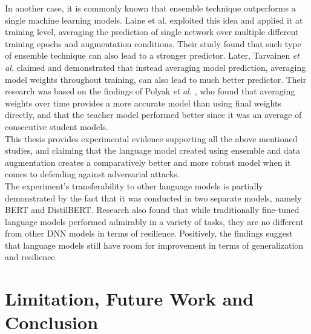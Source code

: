 \documentclass[%
	BCOR=8mm, %
	DIV=12,
	toc=bibliography, %
	toc=listof, %
	oneside, %
	egregdoesnotlikesansseriftitles, %
	]{scrbook}
\begin{document}
In another case, it is commonly known that ensemble technique outperforms a single machine learning models. Laine et al. \cite{laine_temporal_2017} exploited this idea and applied it at training level, averaging the prediction of single network over multiple different training epochs and augmentation conditions. Their study found that such type of ensemble technique can also lead to a stronger predictor. Later,  Tarvainen \textit{et al.}\cite{tarvainen_mean_2018} claimed and demonstrated that instead averaging model prediction, averaging model weights throughout training, can also lead to much better predictor. Their research was based on the findings of Polyak \textit{et al.} \cite{polyak_acceleration_1992}, who found that averaging weights over time provides a more accurate model than using final weights directly, and that the teacher model performed better since it was an average of consecutive student models. \\
This thesis provides experimental evidence supporting all the above mentioned studies, and claiming that the language model created using ensemble and data augmentation creates a comparatively better and more robust model when it comes to defending against adversarial attacks.\\
The experiment's transferability to other language models is partially demonstrated by the fact that it was conducted in two separate models, namely BERT and DistilBERT. Research also found that while traditionally fine-tuned language models performed admirably in a variety of tasks, they are no different from other DNN models in terms of resilience. Positively, the findings suggest that language models still have room for improvement in terms of generalization and resilience.
\chapter{Limitation, Future Work and Conclusion}
\label{chapter:conclusion}
\end{document}
